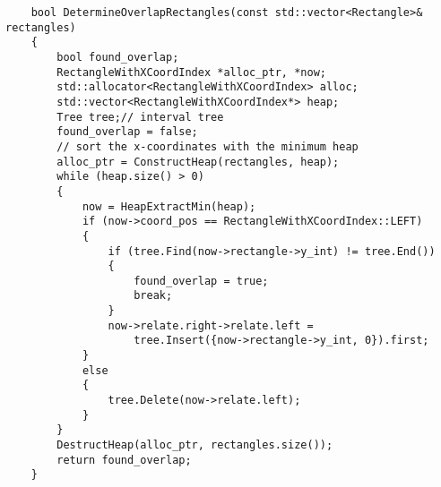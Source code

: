 \begin{verbatim}
    bool DetermineOverlapRectangles(const std::vector<Rectangle>& rectangles)
    {
        bool found_overlap;
        RectangleWithXCoordIndex *alloc_ptr, *now;
        std::allocator<RectangleWithXCoordIndex> alloc;
        std::vector<RectangleWithXCoordIndex*> heap;
        Tree tree;// interval tree
        found_overlap = false;
        // sort the x-coordinates with the minimum heap
        alloc_ptr = ConstructHeap(rectangles, heap);
        while (heap.size() > 0)
        {
            now = HeapExtractMin(heap);
            if (now->coord_pos == RectangleWithXCoordIndex::LEFT)
            {
                if (tree.Find(now->rectangle->y_int) != tree.End())
                {
                    found_overlap = true;
                    break;
                }
                now->relate.right->relate.left = 
                    tree.Insert({now->rectangle->y_int, 0}).first;
            }
            else
            {
                tree.Delete(now->relate.left);
            }
        }
        DestructHeap(alloc_ptr, rectangles.size());
        return found_overlap;
    }
\end{verbatim}


